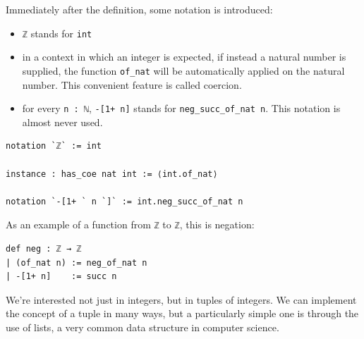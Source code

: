 \documentclass[oneside]{book}
\theoremstyle{definition}
\theoremstyle{remark}
\theoremstyle{plain}
\begin{document}
Immediately after the definition, some notation is introduced:
\begin{itemize}
\item \lstinline{ℤ} stands for \lstinline{int}
\item in a context in which an integer is expected, if instead a natural number is supplied,
the function \lstinline{of_nat} will be automatically applied on the natural number.
This convenient feature is called coercion.
\item for every \lstinline{n : ℕ}, \lstinline{-[1+ n]} stands for \lstinline{neg_succ_of_nat n}.
This notation is almost never used.
\end{itemize}
\begin{lstlisting}
notation `ℤ` := int

instance : has_coe nat int := ⟨int.of_nat⟩

notation `-[1+ ` n `]` := int.neg_succ_of_nat n
\end{lstlisting}
As an example of a function from \lstinline{ℤ} to \lstinline{ℤ}, this is negation:
\begin{lstlisting}
def neg : ℤ → ℤ
| (of_nat n) := neg_of_nat n
| -[1+ n]    := succ n
\end{lstlisting}

We're interested not just in integers, but in tuples of integers.
We can implement the concept of a tuple in many ways,
but a particularly simple one is through the use of lists,
a very common data structure in computer science.
\end{document}

